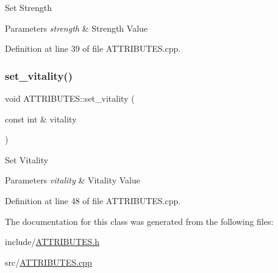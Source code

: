 Set Strength 


\begin{DoxyParams}{Parameters}
{\em strength} & Strength Value\\
\hline
\end{DoxyParams}


Definition at line 39 of file A\+T\+T\+R\+I\+B\+U\+T\+E\+S.\+cpp.

\mbox{\label{class_a_t_t_r_i_b_u_t_e_s_a370dd1a2208caa2a88493ba418fd2fb7}} 
\subsubsection{\texorpdfstring{set\_vitality()}{set\_vitality()}}
{\footnotesize\ttfamily void A\+T\+T\+R\+I\+B\+U\+T\+E\+S\+::set\+\_\+vitality (\begin{DoxyParamCaption}\item[{const int \&}]{vitality }\end{DoxyParamCaption})}



Set Vitality 


\begin{DoxyParams}{Parameters}
{\em vitality} & Vitality Value\\
\hline
\end{DoxyParams}


Definition at line 48 of file A\+T\+T\+R\+I\+B\+U\+T\+E\+S.\+cpp.



The documentation for this class was generated from the following files\+:\begin{DoxyCompactItemize}
\item 
include/\mbox{\hyperlink{_a_t_t_r_i_b_u_t_e_s_8h}{A\+T\+T\+R\+I\+B\+U\+T\+E\+S.\+h}}\item 
src/\mbox{\hyperlink{_a_t_t_r_i_b_u_t_e_s_8cpp}{A\+T\+T\+R\+I\+B\+U\+T\+E\+S.\+cpp}}\end{DoxyCompactItemize}
